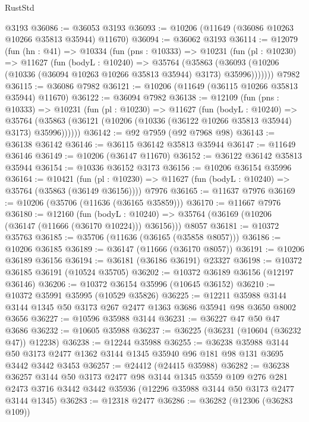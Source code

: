 \begin{lexlean}{RustStd}
\begin{coremodule}
    @3193
@36086 := @36053 @3193
@36093 := @10206 (@11649 (@36086 @10263 @10266 @35813 @35944) @11670)
@36094 := @36062 @3193
@36114 := @12079
    (fun (hn : @41) =>
    @10334
      (fun (pns : @10333) =>
      @10231
        (fun (pl : @10230) =>
        @11627
          (fun (bodyL : @10240) =>
          @35764
            (@35863
              (@36093 (@10206 (@10336 (@36094 @10263 @10266 @35813 @35944) @3173) @35996)))))))
    @7982
@36115 := @36086 @7982
@36121 := @10206 (@11649 (@36115 @10266 @35813 @35944) @11670)
@36122 := @36094 @7982
@36138 := @12109
    (fun (pns : @10333) =>
    @10231
      (fun (pl : @10230) =>
      @11627
        (fun (bodyL : @10240) =>
        @35764 (@35863 (@36121 (@10206 (@10336 (@36122 @10266 @35813 @35944) @3173) @35996))))))
@36142 := @92 @7959 (@92 @7968 @98)
@36143 := @36138 @36142
@36146 := @36115 @36142 @35813 @35944
@36147 := @11649 @36146
@36149 := @10206 (@36147 @11670)
@36152 := @36122 @36142 @35813 @35944
@36154 := @10336 @36152 @3173
@36156 := @10206 @36154 @35996
@36164 := @10421
    (fun (pl : @10230) => @11627 (fun (bodyL : @10240) => @35764 (@35863 (@36149 @36156))))
    @7976
@36165 := @11637 @7976
@36169 := @10206 (@35706 (@11636 (@36165 @35859)))
@36170 := @11667 @7976
@36180 := @12160
    (fun (bodyL : @10240) => @35764 (@36169 (@10206 (@36147 (@11666 (@36170 @10224))) @36156)))
    @8057
@36181 := @10372 @35763
@36185 := @35706 (@11636 (@36165 (@35858 @8057)))
@36186 := @10206 @36185
@36189 := @36147 (@11666 (@36170 @8057))
@36191 := @10206 @36189 @36156
@36194 := @36181 (@36186 @36191) @23327
@36198 := @10372 @36185 @36191 (@10524 @35705)
@36202 := @10372 @36189 @36156 (@12197 @36146)
@36206 := @10372 @36154 @35996 (@10645 @36152)
@36210 := @10372 @35991 @35995 (@10529 @35826)
@36225 := @12211
    @35988
    @3144
    @3144
    @1345
    @50
    @3173
    @267
    @2477
    @1363
    @3686
    @35941
    @98
    @3650
    @8002
    @3656
@36227 := @10596 @35988 @3144
@36231 := @36227 @47 @50 @47 @3686
@36232 := @10605 @35988
@36237 := @36225 (@36231 (@10604 (@36232 @47)) @12238)
@36238 := @12244 @35988
@36255 := @36238
    @35988
    @3144
    @50
    @3173
    @2477
    @1362
    @3144
    @1345
    @35940
    @96
    @181
    @98
    @131
    @3695
    @3442
    @3442
    @3453
@36257 := @24412 (@24415 @35988)
@36282 := @36238
    @36257
    @3144
    @50
    @3173
    @2477
    @98
    @3144
    @1345
    @3559
    @109
    @276
    @281
    @2473
    @3716
    @3442
    @3442
    @35936
    (@12296 @35988 @3144 @50 @3173 @2477 @3144 @1345)
@36283 := @12318 @2477
@36286 := @36282 (@12306 (@36283 @109))

\end{coremodule}
\end{lexlean}
